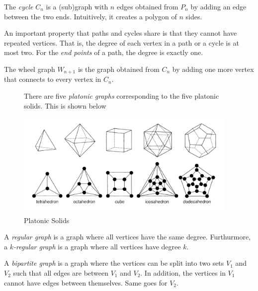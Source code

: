 \begin{definition}[Cycles]
  The \textit{cycle} \(C_n\) is a (sub)graph with \(n\) edges obtained from \(P_n\) by adding an
  edge between the two ends. Intuitively, it creates a polygon of \(n\) sides.
\end{definition}

An important property that paths and cycles share is that they cannot have
repeated vertices. That is, the degree of each vertex in a path or a cycle is at
most two. For the \textit{end points} of a path, the degree is exactly one.

\begin{definition}
  The wheel graph \(W_{n+1}\) is the graph obtained from \(C_n\) by adding one
  more vertex that connects to every vertex in \(C_n\).
\end{definition}

\begin{figure}[ht]
\begin{nexample}
  There are five \textit{platonic graphs} corresponding to the five platonic solids. This
  is shown below

  \begin{center}
    \includegraphics[width=0.95\textwidth]{figures/l01/platonic-solids}
  \end{center}
  \caption{Platonic Solids}\label{fig:l01-platonic-solids}
\end{nexample}
\end{figure}

\begin{definition}
  A \textit{regular graph} is a graph where all vertices have the same degree. 
  Furthurmore, a \textit{\(k\)-regular graph} is a graph where all vertices have degree \(k\).
\end{definition}

\begin{definition}
  A \textit{bipartite graph} is a graph where the vertices can be split into two sets
  \(V_1\) and \(V_2\) such that all edges are between \(V_1\) and \(V_2\). In
  addition, the vertices in \(V_1\) cannot have edges between themselves. Same
  goes for \(V_2\).
\end{definition}

